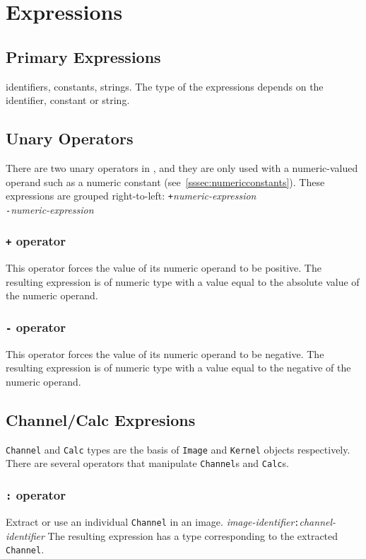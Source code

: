 \section{Expressions}
\label{sec:expressions}

\subsection{Primary Expressions}
\label{ssec:primaryexpresions}
identifiers, constants, strings. The type of the expressions depends on the identifier, constant or string.

\subsection{Unary Operators}
\label{ssec:unaryoperators}
There are two unary operators in \sys{}, and they are only used with a
numeric-valued operand such as a numeric constant
(see~\ref{sssec:numericconstants}).
These expressions are grouped right-to-left:
\startsyn
\texttt{+}\emph{numeric-expression} \\
\texttt{-}\emph{numeric-expression}
\stopsyn

\subsubsection{\texttt{+} operator}
This operator forces the value of its numeric operand to be positive.
The resulting expression is of numeric type with a value equal to the
absolute value of the numeric operand.

\subsubsection{\texttt{-} operator}
This operator forces the value of its numeric operand to be negative.
The resulting expression is of numeric type with a value equal to the
negative of the numeric operand.

\subsection{Channel/Calc Expresions}
\label{ssec:channelexpressions}
\texttt{Channel} and \texttt{Calc} types are the basis of \texttt{Image} and
\texttt{Kernel} objects respectively. There are several operators that
manipulate \texttt{Channel}s and \texttt{Calc}s.

\subsubsection{\texttt{:} operator}
\label{sssec:colonop}
Extract or use an individual \texttt{Channel} in an image.
\startsyn
\emph{image-identifier}\texttt{:}\emph{channel-identifier}
\stopsyn
The resulting expression has a type corresponding to the
extracted \texttt{Channel}.

